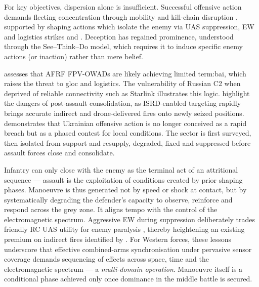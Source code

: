 For key objectives, dispersion alone is insufficient. Successful offensive action demands fleeting concentration through mobility and kill-chain disruption \parencite[62--63]{ZABRODSKYI_2022}, supported by shaping actions which isolate the enemy via UAS suppression, EW and logistics strikes \parencite{uKR_LESSONS_LEARNED_2,neron_bancel_2024_05_27} and \parencite[ch.~9]{Watling_book}. Deception has regained prominence, understood through the See--Think--Do model, which requires it to induce specific enemy actions (or inaction) rather than mere belief.

\textcite{Stepanenko_2025b} assesses that AFRF FPV-OWADs are likely achieving limited \gls{term:bai}, which raises the threat to \gls{gloc} and logistics. The vulnerability of Russian C2 when deprived of reliable connectivity such as Starlink illustrates this logic. \textcite{Dave_2023_9_1,hallatt_2024_03_13_2,tango_2024_03_13} highlight the dangers of post-assault consolidation, as ISRD-enabled targeting rapidly brings accurate indirect and drone-delivered fires onto newly seized positions. \textcite[5--11]{watling_2025_10} demonstrates that Ukrainian offensive action is no longer conceived as a rapid breach but as a phased contest for local conditions. The sector is first surveyed, then isolated from support and resupply, degraded, fixed and suppressed before assault forces close and consolidate.

Infantry can only close with the enemy as the terminal act of an attritional sequence ---  assault is the exploitation of conditions created by prior shaping phases. Manoeuvre is thus generated not by speed or shock at contact, but by systematically degrading the defender’s capacity to observe, reinforce and respond across the grey zone. It aligns tempo with the control of the electromagnetic spectrum. Aggressive EW during suppression deliberately trades friendly RC UAS utility for enemy paralysis \parencite{watling_2025_10}, thereby heightening an existing premium on indirect fires identified by \textcite{darragh_participant_4,stu_lyle_participant_11}. For Western forces, these lessons underscore that effective  combined-arms synchronisation under pervasive sensor coverage demands sequencing of effects across space, time and the electromagnetic spectrum --- a \textit{multi-domain operation}. Manoeuvre itself is a conditional phase achieved only once dominance in the middle battle is secured.

